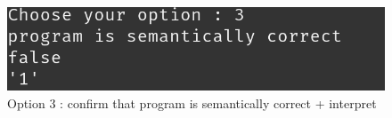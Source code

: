 \begin{itemize}
        \begin{figure}[H]
            \centering
           \includegraphics[scale=0.9]{Introduction/images/option3menu.png}
            \caption{Option 3 : confirm that program is semantically correct + interpret}
            \label{fig:opton 3 interpet}
        \end{figure}

    
\end{itemize}




